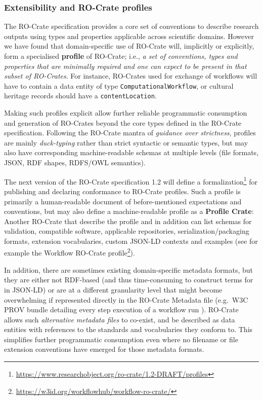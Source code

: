 \subsubsection{Extensibility and RO-Crate profiles}\label{ch5:profiles}

The RO-Crate specification provides a core set of conventions to
describe research outputs using types and properties applicable across
scientific domains. However we have found that domain-specific use of
RO-Crate will, implicitly or explicitly, form a specialised
\textbf{profile} of RO-Crate; i.e., \emph{a set of conventions, types
and properties that are minimally required and one can expect to be
present in that subset of RO-Crates}. For instance, RO-Crates used for
exchange of workflows will have to contain a data entity of type
\texttt{ComputationalWorkflow}, or cultural heritage records should have
a \texttt{contentLocation}.

Making such profiles explicit allow further reliable programmatic
consumption and generation of RO-Crates beyond the core types defined in
the RO-Crate specification. Following the RO-Crate mantra of
\emph{guidance over strictness}, profiles are mainly \emph{duck-typing}
rather than strict syntactic or semantic types, but may also have
corresponding machine-readable schemas at multiple levels (file formats,
JSON, RDF shapes, RDFS/OWL semantics).

The next version of the RO-Crate specification 1.2 will define a
formalization\footnote{\url{https://www.researchobject.org/ro-crate/1.2-DRAFT/profiles}}
for publishing and declaring conformance to RO-Crate profiles. Such a
profile is primarily a human-readable document of before-mentioned
expectations and conventions, but may also define a machine-readable
profile as a \textbf{Profile Crate}: Another RO-Crate that describe the
profile and in addition can list schemas for validation, compatible
software, applicable repositories, serialization/packaging formats,
extension vocabularies, custom JSON-LD contexts and examples (see for
example the Workflow RO-Crate
profile\footnote{\url{https://w3id.org/workflowhub/workflow-ro-crate/}}).


In addition, there are sometimes existing domain-specific metadata
formats, but they are either not RDF-based (and thus time-consuming to
construct terms for in JSON-LD) or are at a different granularity level
that might become overwhelming if represented directly in the RO-Crate
Metadata file (e.g.~W3C PROV bundle detailing every step execution of a
workflow run
\cite{Khan 2019}). RO-Crate
allows such \emph{alternative metadata files} to co-exist, and be
described as data entities with references to the standards and
vocabularies they conform to. This simplifies further programmatic
consumption even where no filename or file extension conventions have
emerged for those metadata formats.

